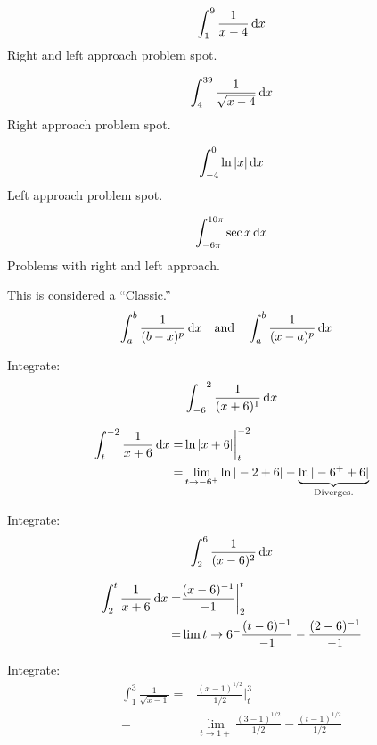 \begin{ex}
	\[ \int^{9}_1 \frac{1}{x-4}\,\mathrm{d} x \]
	Right and left approach problem spot.
\end{ex}
\begin{ex}
	\[ \int^{39}_{4}\frac{1}{\sqrt{x-4}}\,\mathrm{d} x \]
	Right approach problem spot.
\end{ex}
\begin{ex}
	\[ \int^0_{-4} \ln{|x|} \,\mathrm{d} x \]
	Left approach problem spot.
\end{ex}
\begin{ex}
  \[ \int^{10 \pi}_{-6\pi} \sec x \,\mathrm{d} x \]
  Problems with right and left approach.
\end{ex}
\begin{ex}
This is considered a ``Classic.''
  \begin{align*}
    &\int^{b}_{a} \frac{1}{(b-x)^p} \,\mathrm{d} x && \text{and} &&\int^{b}_{a} \frac{1}{(x-a)^p} \,\mathrm{d} x
  \end{align*}
\end{ex}
\begin{ex}
  Integrate:
    \[ \int^{-2}_{-6} \frac{1}{(x+6)^1} \,\mathrm{d} x \]
  \begin{sol}
    \begin{align*}
      \int^{-2}_t \frac{1}{x+6} \,\mathrm{d} x
      =& \ln{|x+6|}\bigg|^{-2}_t \\
      =& \lim_{t \to -6^+} \ln{|-2+6|}-\underbrace{\ln{|-6^++6|}}_\text{Diverges.}
    \end{align*}
  \end{sol}
\end{ex}
\begin{ex}
  Integrate:
    \[ \int^{6}_{2} \frac{1}{(x-6)^2} \,\mathrm{d} x \]
  \begin{sol}
  \begin{align*}
    \int^{t}_2 \frac{1}{x+6} \,\mathrm{d} x
    =& \frac{(x-6)^{-1}}{-1} \bigg|^t_2 \\
    =& \lim{t \to 6^-} \frac{(t-6)^{-1}}{-1}-\frac{(2-6)^{-1}}{-1}
  \end{align*}
\end{sol}
\end{ex}
\begin{ex}
  Integrate:
  \begin{align*}
    \int^{3}_{1} \frac{1}{\sqrt{x-1}}
    =& \frac{(x-1)^{1/2}}{1/2}\bigg|^3_t \\
    =& \lim_{t \to 1+} \frac{(3-1)^{1/2}}{1/2}-\frac{(t-1)^{1/2}}{1/2}
  \end{align*}
\end{ex}

